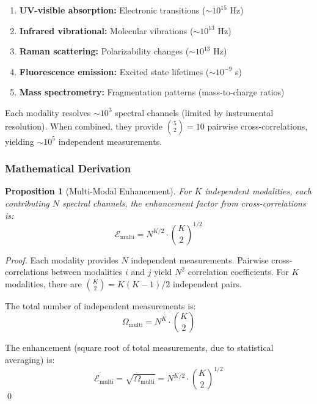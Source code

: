 \documentclass[twocolumn,10pt]{article}
\newtheorem{proposition}[theorem]{Proposition}
\theoremstyle{remark}
\begin{document}
\begin{enumerate}
    \item \textbf{UV-visible absorption:} Electronic transitions ($\sim 10^{15}$ Hz)
    \item \textbf{Infrared vibrational:} Molecular vibrations ($\sim 10^{13}$ Hz)
    \item \textbf{Raman scattering:} Polarizability changes ($\sim 10^{13}$ Hz)
    \item \textbf{Fluorescence emission:} Excited state lifetimes ($\sim 10^{-9}$ s)
    \item \textbf{Mass spectrometry:} Fragmentation patterns (mass-to-charge ratios)
\end{enumerate}

Each modality resolves $\sim 10^3$ spectral channels (limited by instrumental resolution). When combined, they provide $\binom{5}{2} = 10$ pairwise cross-correlations, yielding $\sim 10^5$ independent measurements.

\subsubsection{Mathematical Derivation}

\begin{proposition}[Multi-Modal Enhancement]
\label{prop:multimodal_enhancement}
For $K$ independent modalities, each contributing $N$ spectral channels, the enhancement factor from cross-correlations is:
\begin{equation}
    \mathcal{E}_{\text{multi}} = N^{K/2} \cdot \binom{K}{2}^{1/2}
    \label{eq:multimodal_enhancement}
\end{equation}
\end{proposition}

\begin{proof}
Each modality provides $N$ independent measurements. Pairwise cross-correlations between modalities $i$ and $j$ yield $N^2$ correlation coefficients. For $K$ modalities, there are $\binom{K}{2} = K(K-1)/2$ independent pairs.

The total number of independent measurements is:
\begin{equation}
    \Omega_{\text{multi}} = N^K \cdot \binom{K}{2}
    \label{eq:multimodal_total}
\end{equation}

The enhancement (square root of total measurements, due to statistical averaging) is:
\begin{equation}
    \mathcal{E}_{\text{multi}} = \sqrt{\Omega_{\text{multi}}} = N^{K/2} \cdot \binom{K}{2}^{1/2}
\end{equation}
\qed
\end{proof}
\end{document}
